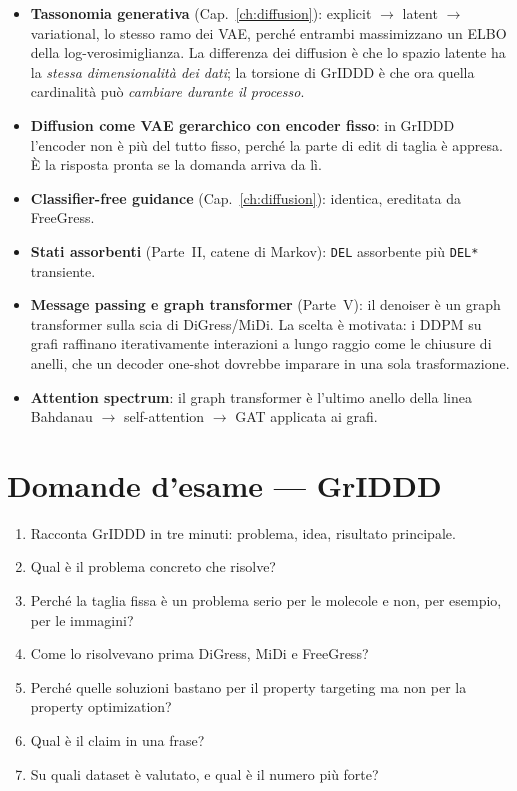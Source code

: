 \begin{tcolorbox}[mybox, title={Connessioni}]
\begin{itemize}
  \item \textbf{Tassonomia generativa} (Cap.~\ref{ch:diffusion}): explicit $\to$ latent $\to$ variational, lo stesso ramo dei VAE, perché entrambi massimizzano un ELBO della log-verosimiglianza. La differenza dei diffusion è che lo spazio latente ha la \emph{stessa dimensionalità dei dati}; la torsione di GrIDDD è che ora quella cardinalità può \emph{cambiare durante il processo}.
  \item \textbf{Diffusion come VAE gerarchico con encoder fisso}: in GrIDDD l'encoder non è più del tutto fisso, perché la parte di edit di taglia è appresa. È la risposta pronta se la domanda arriva da lì.
  \item \textbf{Classifier-free guidance} (Cap.~\ref{ch:diffusion}): identica, ereditata da FreeGress.
  \item \textbf{Stati assorbenti} (Parte~II, catene di Markov): \texttt{DEL} assorbente più \texttt{DEL*} transiente.
  \item \textbf{Message passing e graph transformer} (Parte~V): il denoiser è un graph transformer sulla scia di DiGress/MiDi. La scelta è motivata: i DDPM su grafi raffinano iterativamente interazioni a lungo raggio come le chiusure di anelli, che un decoder one-shot dovrebbe imparare in una sola trasformazione.
  \item \textbf{Attention spectrum}: il graph transformer è l'ultimo anello della linea Bahdanau $\to$ self-attention $\to$ GAT applicata ai grafi.
\end{itemize}
\end{tcolorbox}

\section{Domande d'esame — GrIDDD}

\begin{tcolorbox}[mywarn, title={Livello 1 — sai raccontarlo}]
\begin{enumerate}
  \item Racconta GrIDDD in tre minuti: problema, idea, risultato principale.
  \item Qual è il problema concreto che risolve?
  \item Perché la taglia fissa è un problema serio per le molecole e non, per esempio, per le immagini?
  \item Come lo risolvevano prima DiGress, MiDi e FreeGress?
  \item Perché quelle soluzioni bastano per il property targeting ma non per la property optimization?
  \item Qual è il claim in una frase?
  \item Su quali dataset è valutato, e qual è il numero più forte?
\end{enumerate}
\end{tcolorbox}

